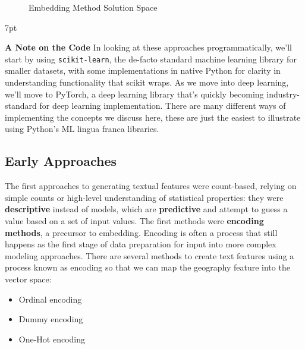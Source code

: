\documentclass[11pt, table]{diazessay} %
\newenvironment{formal}{%
  \def\FrameCommand{%
	\hspace{1pt}%
	{\color{w_lightblue}\vrule width 2pt}%
	{\color{formalshade}\vrule width 4pt}%
	\colorbox{formalshade}%
  }%
  \MakeFramed{\advance\hsize-\width\FrameRestore}%
  \noindent\hspace{-4.55pt}%
  \begin{adjustwidth}{}{7pt}%
  \vspace{2pt}\vspace{2pt}%
}
{%
  \vspace{2pt}\end{adjustwidth}\endMakeFramed%
}
\begin{document}
\begin{sloppypar}
\begin{figure}[H]
	\centering
 	\caption{Embedding Method Solution Space}
\end{figure}

\begin{formal}
\textbf{A Note on the Code}
In looking at these approaches programmatically, we'll start by using \texttt{scikit-learn}, the de-facto standard machine learning library for smaller datasets, with some implementations in native Python for clarity in understanding functionality that scikit wraps.  As we move into deep learning, we'll move to PyTorch, a deep learning library that's quickly becoming industry-standard for deep learning implementation. There are many different ways of implementing the concepts we discuss here, these are just the easiest to illustrate using Python's ML lingua franca libraries.
\end{formal}

\subsection{Early Approaches}

The first approaches to generating textual features were count-based, relying on simple counts or high-level understanding of statistical properties: they were \textbf{descriptive} instead of models, which are \textbf{predictive} and attempt to guess a value based on a set of input values.  The first methods were \textbf{encoding methods}, a precursor to embedding. Encoding is often a process that still happens as the first stage of data preparation for input into more complex modeling approaches.  There are several methods to create text features using a process known as encoding so that we can map the geography feature into the vector space:

\begin{itemize}
  \item Ordinal encoding   
  \item Dummy encoding
  \item One-Hot encoding
\end{itemize}


\end{sloppypar}
\end{document}
